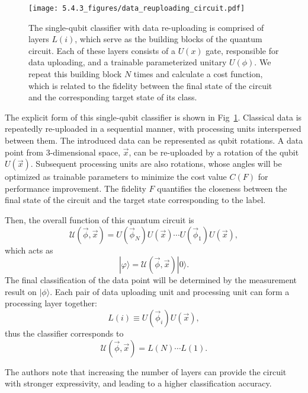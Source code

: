 \begin{figure}[h]
    \begin{center}
        \texttt{[image: 5.4.3\_figures/data\_reuploading\_circuit.pdf]}
    \end{center}
    \captionsetup{justification=raggedright,singlelinecheck=false}
    \caption{The single-qubit classifier with data re-uploading is comprised of layers $L(i)$, which serve as the building blocks of the quantum circuit. Each of these layers consists of a $U(x)$ gate, responsible for data uploading, and a trainable parameterized unitary $U(\phi)$. We repeat this building block $N$ times and calculate a cost function, which is related to the fidelity between the final state of the circuit and the corresponding target state of its class.}
    \label{data_reuploading_circuit}
\end{figure}

The explicit form of this single-qubit classifier is
shown in Fig~\ref{data_reuploading_circuit}. Classical data is repeatedly re-uploaded in a sequential manner, with processing units interspersed between them. The introduced data can be represented as qubit rotations.  A data point from 3-dimensional space, $\overrightarrow{x}$, can be re-uploaded by a rotation of the qubit $U(\overrightarrow{x})$. Subsequent processing units are also rotations, whose angles will be optimized as trainable parameters to minimize the cost value $C(F)$ for performance improvement. The fidelity $F$ quantifies the closeness between the final state of the circuit and the target state corresponding to the label.

Then, the overall function of this quantum circuit is
$$\mathcal{U}(\overrightarrow{\phi},\overrightarrow{x})=U(\overrightarrow{\phi}_N)U(\overrightarrow{x})\cdots U(\overrightarrow{\phi}_1)U(\overrightarrow{x}),$$
which acts as
$$|\varphi\rangle=\mathcal{U}(\overrightarrow{\phi},\overrightarrow{x})|0\rangle.$$
The final classification of the data point will be determined by the measurement result on $|\phi\rangle$. Each pair of data uploading unit and processing unit can form a processing layer together:
$$L(i)\equiv U(\overrightarrow{\phi}_i)U(\overrightarrow{x}),$$
thus the classifier corresponds to
$$\mathcal{U}(\overrightarrow{\phi},\overrightarrow{x})=L(N)\cdots L(1).$$

The authors note that increasing the number of layers can provide the circuit with stronger expressivity, and leading to a higher classification accuracy.

